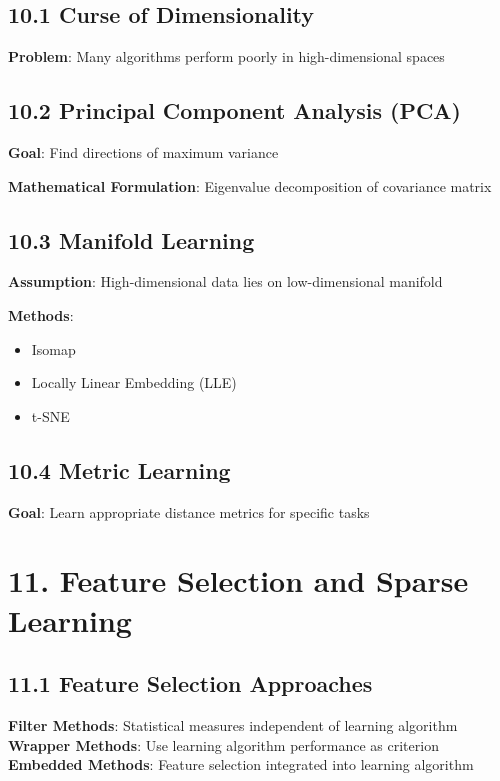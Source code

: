 \documentclass{amsart}
\theoremstyle{plain}
\theoremstyle{definition}
\theoremstyle{remark}
\begin{document}
\subsection{10.1 Curse of Dimensionality}

\textbf{Problem}: Many algorithms perform poorly in high-dimensional spaces

\subsection{10.2 Principal Component Analysis (PCA)}

\textbf{Goal}: Find directions of maximum variance

\textbf{Mathematical Formulation}: Eigenvalue decomposition of covariance matrix

\subsection{10.3 Manifold Learning}

\textbf{Assumption}: High-dimensional data lies on low-dimensional manifold

\textbf{Methods}:

\begin{itemize}
	\item Isomap
	\item Locally Linear Embedding (LLE)
	\item t-SNE
\end{itemize}

\subsection{10.4 Metric Learning}

\textbf{Goal}: Learn appropriate distance metrics for specific tasks

\section{11. Feature Selection and Sparse Learning}

\subsection{11.1 Feature Selection Approaches}

\textbf{Filter Methods}: Statistical measures independent of learning algorithm
\textbf{Wrapper Methods}: Use learning algorithm performance as criterion
\textbf{Embedded Methods}: Feature selection integrated into learning algorithm
\end{document}
